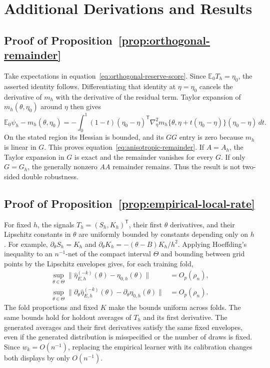 \section{Additional Derivations and Results}

\subsection{Proof of Proposition~\ref{prop:orthogonal-remainder}}

Take expectations in equation~\eqref{eq:orthogonal-reserve-score}. Since
$\mathbb E_0T_h=\eta_0$, the asserted identity follows. Differentiating that
identity at $\eta=\eta_0$ cancels the derivative of $m_h$ with the derivative
of the residual term. Taylor expansion of $m_h(\theta,\eta_0)$ around $\eta$
then gives
\begin{equation}
\mathbb E_0\psi_h-m_h(\theta,\eta_0)
=-\int_0^1(1-t)(\eta_0-\eta)^{\mathsf T}
\nabla_\eta^2m_h\{\theta,\eta+t(\eta_0-\eta)\}
(\eta_0-\eta)\,dt.
\end{equation}
On the stated region its Hessian is bounded, and its $GG$ entry is zero
because $m_h$ is linear in $G$. This proves
equation~\eqref{eq:anisotropic-remainder}. If $A=A_h$, the Taylor expansion
in $G$ is exact and the remainder vanishes for every $G$. If only $G=G_h$,
the generally nonzero $AA$ remainder remains. Thus the result is not
two-sided double robustness.

\subsection{Proof of Proposition~\ref{prop:empirical-local-rate}}

For fixed $h$, the signals $T_h=(S_h,K_h)^{\mathsf T}$, their first
$\theta$ derivatives, and their Lipschitz constants in $\theta$ are uniformly
bounded by constants depending only on $h$. For example,
$\partial_\theta S_h=K_h$ and
$\partial_\theta K_h=-(\theta-B)K_h/h^2$. Applying Hoeffding's inequality
to an $n^{-1}$-net of the compact interval $\Theta$ and bounding between grid
points by the Lipschitz envelopes gives, for each training fold,
\begin{align}
\sup_{\theta\in\Theta}
\|\widehat\eta_{E,h}^{(-k)}(\theta)-\eta_{0,h}(\theta)\|
&=O_p(\rho_n),\\
\sup_{\theta\in\Theta}
\|\partial_\theta\widehat\eta_{E,h}^{(-k)}(\theta)
-\partial_\theta\eta_{0,h}(\theta)\|
&=O_p(\rho_n).
\end{align}
The fold proportions and fixed $K$ make the bounds uniform across folds. The
same bounds hold for holdout averages of $T_h$ and its first derivative.
The generated averages and their first derivatives satisfy the same fixed
envelopes, even if the generated distribution is misspecified or the number of
draws is fixed. Since $w_k=O(n^{-1})$, replacing the empirical learner with its
calibration changes both displays by only $O(n^{-1})$.


